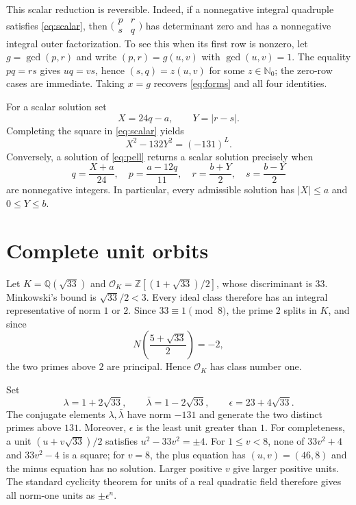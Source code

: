 \documentclass[11pt]{article}
\newcommand{\NN}{\mathbb N_0}
\newcommand{\OK}{\mathcal O_K}
\begin{document}
This scalar reduction is reversible.  Indeed, if a nonnegative integral
quadruple satisfies \eqref{eq:scalar}, then
$\bigl(\begin{smallmatrix}p&r\\s&q\end{smallmatrix}\bigr)$ has determinant
zero and has a nonnegative integral outer factorization.  To see this when
its first row is nonzero, let $g=\gcd(p,r)$ and write
$(p,r)=g(u,v)$ with $\gcd(u,v)=1$.  The equality $pq=rs$ gives
$uq=vs$, hence $(s,q)=z(u,v)$ for some $z\in\NN$; the zero-row cases are
immediate.  Taking $x=g$ recovers \eqref{eq:forms} and all four identities.

For a scalar solution set
\[
X=24q-a,\qquad Y=|r-s|.
\]
Completing the square in \eqref{eq:scalar} yields
\begin{equation}\label{eq:pell}
X^2-132Y^2=(-131)^L.
\end{equation}
Conversely, a solution of \eqref{eq:pell} returns a scalar solution precisely
when
\begin{equation}\label{eq:reconstruct}
q=\frac{X+a}{24},\quad p=\frac{a-12q}{11},\quad
r=\frac{b+Y}{2},\quad s=\frac{b-Y}{2}
\end{equation}
are nonnegative integers.  In particular, every admissible solution has
$|X|\leq a$ and $0\leq Y\leq b$.

\section{Complete unit orbits}

Let $K=\mathbb Q(\sqrt{33})$ and
$\OK=\mathbb Z[(1+\sqrt{33})/2]$, whose discriminant is $33$.  Minkowski's
bound is $\sqrt{33}/2<3$.  Every ideal class therefore has an integral
representative of norm $1$ or $2$.  Since $33\equiv1\pmod 8$, the prime $2$
splits in $K$, and since
\[
N\!\left(\frac{5+\sqrt{33}}2\right)=-2,
\]
the two primes above $2$ are principal.  Hence $\OK$ has class number one.

Set
\[
\lambda=1+2\sqrt{33},\qquad \bar\lambda=1-2\sqrt{33},\qquad
\epsilon=23+4\sqrt{33}.
\]
The conjugate elements $\lambda,\bar\lambda$ have norm $-131$ and generate
the two distinct primes above $131$.  Moreover, $\epsilon$ is the least unit
greater than $1$.  For completeness, a unit $(u+v\sqrt{33})/2$ satisfies
$u^2-33v^2=\pm4$.  For $1\leq v<8$, none of
$33v^2+4$ and $33v^2-4$ is a square; for $v=8$, the plus equation has
$(u,v)=(46,8)$ and the minus equation has no solution.  Larger positive $v$
give larger positive units.  The standard cyclicity theorem for units of a
real quadratic field \cite[Chap.~I]{Neukirch1999} therefore gives all
norm-one units as $\pm\epsilon^n$.
\end{document}
